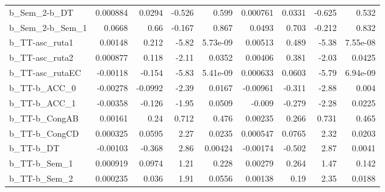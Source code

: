 \begin{tabular}{lrrrrrrrr}
b\_Sem\_2-b\_DT         &    0.000884 &       0.0294 &  -0.526 &    0.599 &   0.000761 &      0.0331 &       -0.625 &         0.532 \\
b\_Sem\_2-b\_Sem\_1      &      0.0668 &         0.66 &  -0.167 &    0.867 &     0.0493 &       0.703 &       -0.212 &         0.832 \\
b\_TT-asc\_ruta1       &     0.00148 &        0.212 &   -5.82 & 5.73e-09 &    0.00513 &       0.489 &        -5.38 &      7.55e-08 \\
b\_TT-asc\_ruta2       &    0.000877 &        0.118 &   -2.11 &   0.0352 &    0.00406 &       0.381 &        -2.03 &        0.0425 \\
b\_TT-asc\_rutaEC      &    -0.00118 &       -0.154 &   -5.83 & 5.41e-09 &   0.000633 &      0.0603 &        -5.79 &      6.94e-09 \\
b\_TT-b\_ACC\_0         &    -0.00278 &      -0.0992 &   -2.39 &   0.0167 &   -0.00961 &      -0.311 &        -2.88 &         0.004 \\
b\_TT-b\_ACC\_1         &    -0.00358 &       -0.126 &   -1.95 &   0.0509 &     -0.009 &      -0.279 &        -2.28 &        0.0225 \\
b\_TT-b\_CongAB        &     0.00161 &         0.24 &   0.712 &    0.476 &    0.00235 &       0.266 &        0.731 &         0.465 \\
b\_TT-b\_CongCD        &    0.000325 &       0.0595 &    2.27 &   0.0235 &   0.000547 &      0.0765 &         2.32 &        0.0203 \\
b\_TT-b\_DT            &    -0.00103 &       -0.368 &    2.86 &  0.00424 &   -0.00174 &      -0.502 &         2.87 &        0.0041 \\
b\_TT-b\_Sem\_1         &    0.000919 &       0.0974 &    1.21 &    0.228 &    0.00279 &       0.264 &         1.47 &         0.142 \\
b\_TT-b\_Sem\_2         &    0.000235 &        0.036 &    1.91 &   0.0556 &    0.00138 &        0.19 &         2.35 &        0.0188 \\
\bottomrule
\end{tabular}

